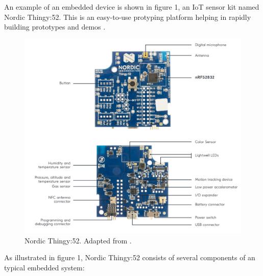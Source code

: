 An example of an embedded device is shown in figure 1, an IoT sensor kit named
Nordic Thingy:52. This is an easy-to-use protyping platform helping in rapidly
building prototypes and demos \cite{Thingy19}. 
\begin{figure}[H]
\centering
\includegraphics[scale=1.6]{figure/figure01_thingy_52.png}
\caption{Nordic Thingy:52. Adapted from \cite{Thingy19}.}
\end{figure}
\justify
As illustrated in figure 1, Nordic Thingy:52 consists of several components of an
typical embedded system:

